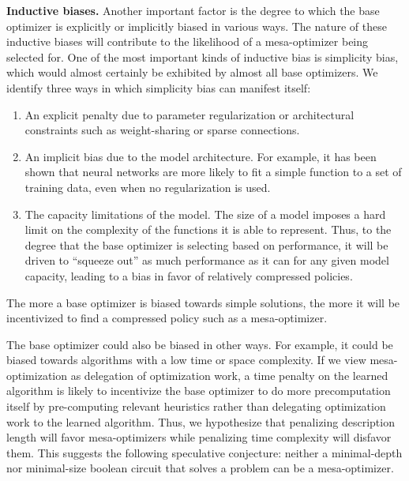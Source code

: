 \documentclass[
  onecolumn,
  natbib,
]{miri-tech-article}
\begin{document}
\textbf{Inductive biases.} Another important factor is the degree to which the base optimizer is explicitly or implicitly biased in various ways. The nature of these inductive biases will contribute to the likelihood of a mesa-optimizer being selected for. One of the most important kinds of inductive bias is simplicity bias, which would almost certainly be exhibited by almost all base optimizers. We identify three ways in which simplicity bias can manifest itself:
\begin{enumerate}
\item An explicit penalty due to parameter regularization or architectural constraints such as weight-sharing or sparse connections.
\item An implicit bias due to the model architecture. For example, it has been shown that neural networks are more likely to fit a simple function to a set of training data, even when no regularization is used.\cite{nn_simp_bias}
\item The capacity limitations of the model. The size of a model imposes a hard limit on the complexity of the functions it is able to represent. Thus, to the degree that the base optimizer is selecting based on performance, it will be driven to ``squeeze out'' as much performance as it can for any given model capacity, leading to a bias in favor of relatively compressed policies.
\end{enumerate}
The more a base optimizer is biased towards simple solutions, the more it will be incentivized to find a compressed policy such as a mesa-optimizer.

The base optimizer could also be biased in other ways. For example, it could be biased towards algorithms with a low time or space complexity. If we view mesa-optimization as delegation of optimization work, a time penalty on the learned algorithm is likely to incentivize the base optimizer to do more precomputation itself by pre-computing relevant heuristics rather than delegating optimization work to the learned algorithm. Thus, we hypothesize that penalizing description length will favor mesa-optimizers while penalizing time complexity will disfavor them. This suggests the following speculative conjecture: neither a minimal-depth nor minimal-size boolean circuit that solves a problem can be a mesa-optimizer.\cite{paul_minimal_circuits}
\end{document}
